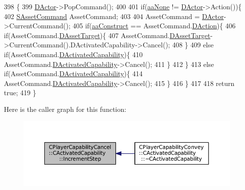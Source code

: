 \begin{DoxyCode}
398                                                                \{
399     \hyperlink{classCActivatedPlayerCapability_a54ca944b47bff2718330639941d402b0}{DActor}->PopCommand();
400     
401     \textcolor{keywordflow}{if}(\hyperlink{GameDataTypes_8h_ab47668e651a3032cfb9c40ea2d60d670ac17cc5a0035320c060d7f8074143b507}{aaNone} != \hyperlink{classCActivatedPlayerCapability_a54ca944b47bff2718330639941d402b0}{DActor}->Action())\{
402         \hyperlink{structSAssetCommand}{SAssetCommand} AssetCommand;
403         
404         AssetCommand = \hyperlink{classCActivatedPlayerCapability_a54ca944b47bff2718330639941d402b0}{DActor}->CurrentCommand();
405         \textcolor{keywordflow}{if}(\hyperlink{GameDataTypes_8h_ab47668e651a3032cfb9c40ea2d60d670a7ef6b863f66dd7dcc95a199cd758ae1d}{aaConstruct} == AssetCommand.\hyperlink{structSAssetCommand_a8edd3b3d59a76d5514ba403bc8076a75}{DAction})\{
406             \textcolor{keywordflow}{if}(AssetCommand.\hyperlink{structSAssetCommand_a3d9b43f6e59c386c48c41a65448a0c39}{DAssetTarget})\{
407                 AssetCommand.\hyperlink{structSAssetCommand_a3d9b43f6e59c386c48c41a65448a0c39}{DAssetTarget}->CurrentCommand().DActivatedCapability->Cancel();
408             \}
409             \textcolor{keywordflow}{else} \textcolor{keywordflow}{if}(AssetCommand.\hyperlink{structSAssetCommand_ad8beda19520811cc70fe1eab16c774dd}{DActivatedCapability})\{
410                 AssetCommand.\hyperlink{structSAssetCommand_ad8beda19520811cc70fe1eab16c774dd}{DActivatedCapability}->Cancel();
411             \}
412         \}
413         \textcolor{keywordflow}{else} \textcolor{keywordflow}{if}(AssetCommand.\hyperlink{structSAssetCommand_ad8beda19520811cc70fe1eab16c774dd}{DActivatedCapability})\{
414             AssetCommand.\hyperlink{structSAssetCommand_ad8beda19520811cc70fe1eab16c774dd}{DActivatedCapability}->Cancel();
415         \}
416     \}
417     
418     \textcolor{keywordflow}{return} \textcolor{keyword}{true};
419 \}
\end{DoxyCode}
Here is the caller graph for this function\+:\nopagebreak
\begin{figure}[H]
\begin{center}
\leavevmode
\includegraphics[width=350pt]{classCPlayerCapabilityCancel_1_1CActivatedCapability_a28351293b3a662bca20a2d666b8801e1_icgraph}
\end{center}
\end{figure}
